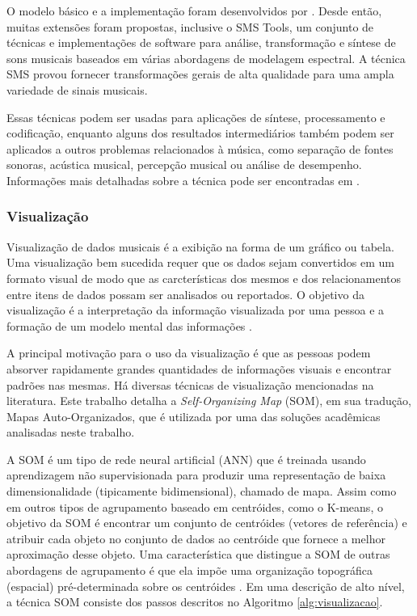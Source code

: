 O modelo básico e a implementação foram desenvolvidos por . Desde então, muitas extensões foram propostas, inclusive o SMS Tools, um conjunto de técnicas e implementações de software para análise, transformação e síntese de sons musicais baseados em várias abordagens de modelagem espectral. A técnica SMS provou fornecer transformações gerais de alta qualidade para uma ampla variedade de sinais musicais.

Essas técnicas podem ser usadas para aplicações de síntese, processamento e codificação, enquanto alguns dos resultados intermediários também podem ser aplicados a outros problemas relacionados à música, como separação de fontes sonoras, acústica musical, percepção musical ou análise de desempenho. Informações mais detalhadas sobre a técnica pode ser encontradas em \cite{serra1990}.

\subsubsection{Visualização} \label{subsubsec:visualizacao}
Visualização de dados musicais é a exibição na forma de um gráfico ou tabela. Uma visualização bem sucedida requer que os dados sejam convertidos em um formato visual de modo que as carcterísticas dos mesmos e dos relacionamentos entre itens de dados possam ser analisados ou reportados. O objetivo da visualização é a interpretação da informação visualizada por uma pessoa e a formação de um modelo mental das informações \cite{pang2009}.

A principal motivação para o uso da visualização é que as pessoas podem absorver rapidamente grandes quantidades de informações visuais e encontrar padrões nas mesmas. Há diversas técnicas de visualização mencionadas na literatura. Este trabalho detalha a \textit{Self-Organizing Map} (SOM), em sua tradução, Mapas Auto-Organizados, que é utilizada por uma das soluções acadêmicas analisadas neste trabalho.


A SOM é um tipo de rede neural artificial (ANN) que é treinada usando aprendizagem não supervisionada para produzir uma representação de baixa dimensionalidade (tipicamente bidimensional), chamado de mapa. Assim como em outros tipos de agrupamento baseado em centróides, como o K-means, o objetivo da SOM é encontrar um conjunto de centróides (vetores de referência) e atribuir cada objeto no conjunto de dados ao centróide que fornece a melhor aproximação desse objeto. Uma característica que distingue a SOM de outras abordagens de agrupamento é que ela impõe uma organização topográfica (espacial) pré-determinada sobre os centróides \cite{pang2009}. Em uma descrição de alto nível, a técnica SOM consiste dos passos descritos no Algoritmo \ref{alg:visualizacao}.

